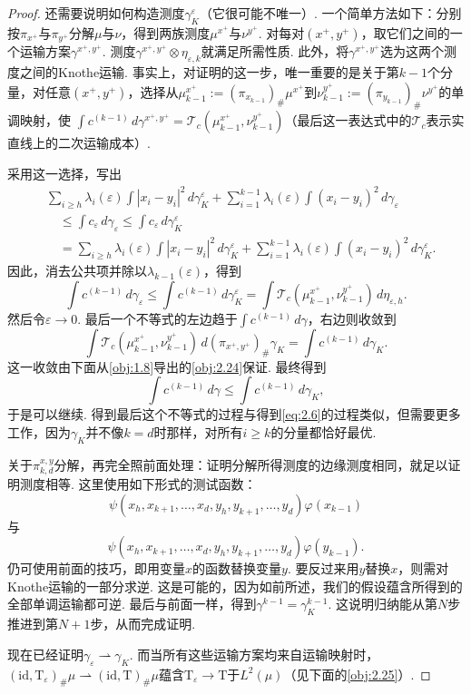 \begin{proof}
还需要说明如何构造测度$\gamma_K^\varepsilon$（它很可能不唯一）. 一个简单方法如下：分别按$\pi_{x^+}$与$\pi_{y^+}$分解$\mu$与$\nu$，得到两族测度$\mu^{x^+}$与$\nu^{y^+}$. 对每对$(x^+,y^+)$，取它们之间的一个运输方案$\gamma^{x^+,y^+}$. 测度$\gamma^{x^+,y^+}\otimes\eta_{\varepsilon,k}$就满足所需性质. 此外，将$\gamma^{x^+,y^+}$选为这两个测度之间的Knothe运输. 事实上，对证明的这一步，唯一重要的是关于第$k-1$个分量，对任意$(x^+,y^+)$，选择从$\mu_{k-1}^{x^+}:=(\pi_{x_{k-1}})_\#\mu^{x^+}$到$\nu_{k-1}^{y^+}:=(\pi_{y_{k-1}})_\#\nu^{y^+}$的单调映射，使
$\int c^{(k-1)}\,d\gamma^{x^+,y^+}=\mathscr T_c(\mu_{k-1}^{x^+},\nu_{k-1}^{y^+})$（最后这一表达式中的$\mathscr T_c$表示实直线上的二次运输成本）.

采用这一选择，写出
\[
\begin{aligned}
&\sum_{i\ge h}\lambda_i(\varepsilon)\int|x_i-y_i|^2\,d\gamma_K^\varepsilon
+\sum_{i=1}^{k-1}\lambda_i(\varepsilon)\int(x_i-y_i)^2\,d\gamma_\varepsilon\\
&\quad\le\int c_\varepsilon\,d\gamma_\varepsilon\le\int c_\varepsilon\,d\gamma_K^\varepsilon\\
&\quad=\sum_{i\ge h}\lambda_i(\varepsilon)\int|x_i-y_i|^2\,d\gamma_K^\varepsilon
+\sum_{i=1}^{k-1}\lambda_i(\varepsilon)\int(x_i-y_i)^2\,d\gamma_K^\varepsilon.
\end{aligned}
\]
因此，消去公共项并除以$\lambda_{k-1}(\varepsilon)$，得到
\[
\int c^{(k-1)}\,d\gamma_\varepsilon
\le\int c^{(k-1)}\,d\gamma_K^\varepsilon
=\int\mathscr T_c(\mu_{k-1}^{x^+},\nu_{k-1}^{y^+})\,d\eta_{\varepsilon,h}.
\]
然后令$\varepsilon\to0$. 最后一个不等式的左边趋于$\int c^{(k-1)}\,d\gamma$，右边则收敛到
\[
\int\mathscr T_c(\mu_{k-1}^{x^+},\nu_{k-1}^{y^+})\,d(\pi_{x^+,y^+})_\#\gamma_K
=\int c^{(k-1)}\,d\gamma_K.
\]
这一收敛由下面从\autoref{obj:1.8}导出的\autoref{obj:2.24}保证. 最终得到
\[
\int c^{(k-1)}\,d\gamma\le\int c^{(k-1)}\,d\gamma_K,
\]
于是可以继续. 得到最后这个不等式的过程与得到\eqref{eq:2.6}的过程类似，但需要更多工作，因为$\gamma_K$并不像$k=d$时那样，对所有$i\ge k$的分量都恰好最优.

关于$\pi_{k,d}^{x,y}$分解，再完全照前面处理：证明分解所得测度的边缘测度相同，就足以证明测度相等. 这里使用如下形式的测试函数：
\[
\psi(x_h,x_{k+1},\ldots,x_d,y_h,y_{k+1},\ldots,y_d)\varphi(x_{k-1})
\]
与
\[
\psi(x_h,x_{k+1},\ldots,x_d,y_h,y_{k+1},\ldots,y_d)\varphi(y_{k-1}).
\]
仍可使用前面的技巧，即用变量$x$的函数替换变量$y$. 要反过来用$y$替换$x$，则需对Knothe运输的一部分求逆. 这是可能的，因为如前所述，我们的假设蕴含所得到的全部单调运输都可逆. 最后与前面一样，得到$\gamma^{k-1}=\gamma_K^{k-1}$. 这说明归纳能从第$N$步推进到第$N+1$步，从而完成证明.

现在已经证明$\gamma_\varepsilon\rightharpoonup\gamma_K$. 而当所有这些运输方案均来自运输映射时，$(\mathrm{id},\mathrm T_\varepsilon)_\#\mu\rightharpoonup(\mathrm{id},\mathrm T)_\#\mu$蕴含$\mathrm T_\varepsilon\to\mathrm T$于$L^2(\mu)$（见下面的\autoref{obj:2.25}）.
\end{proof}

